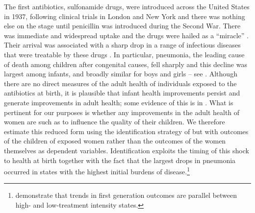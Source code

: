 \documentclass[subeqn]{article}
\begin{document}
\begin{spacing}{1.4}
The first antibiotics, sulfonamide drugs, were introduced across the United States in 1937, following clinical trials in London and New York and there was nothing else on the stage until penicillin was introduced during the Second War. There was immediate and widespread uptake and the drugs were hailed as a ``miracle'' \citep{Lesch2006}. Their arrival was associated with a sharp drop in a range of infectious diseases that were treatable by these drugs \citep{Jayachandranetal2010}. In particular, pneumonia, the leading cause of death among children after congenital causes, fell sharply and this decline was largest among infants, and broadly similar for boys and girls -- see \citep{BhalotraVenkataramani2014}. Although there are no direct measures of the adult health of individuals exposed to the antibiotics at birth, it is plausible that infant health improvements persist and generate improvements in adult health; some evidence of this is in \citep{Almondetal2011b,ButikoferSalvanes2015,Hjortetal2016,Bhalotraetal2015}. What is pertinent for our purposes is whether any improvements in the adult health of women are such as to influence the quality of their children. We therefore estimate this reduced form using the identification strategy of \citep{BhalotraVenkataramani2014} but with outcomes of the children of exposed women rather than the outcomes of the women themselves as dependent variables.
Identification exploits the timing of this shock to health at birth together with the fact that the largest drops in pneumonia occurred in states with the highest initial burdens of disease.\footnote{\citet{BhalotraVenkataramani2014} demonstrate that trends in first generation outcomes are parallel between high- and low-treatment intensity states. } 
 

\end{spacing}
\end{document}
